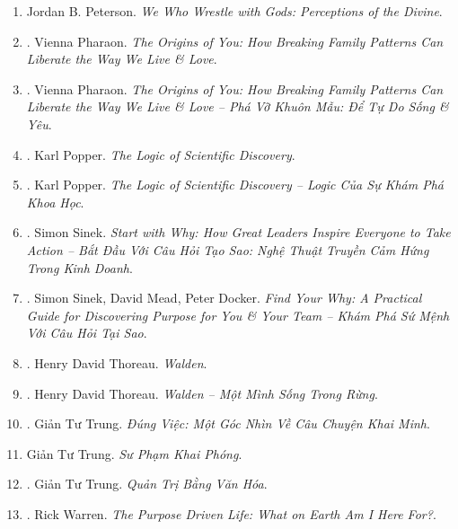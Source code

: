 \documentclass{article}
\begin{document}
\begin{enumerate}
	\item {\sc Jordan B. Peterson}. {\it We Who Wrestle with Gods: Perceptions of the Divine}.
	
	\item \cite{Pharaon_origins}. {\sc Vienna Pharaon}. {\it The Origins of You: How Breaking Family Patterns Can Liberate the Way We Live \& Love}.
	
	\item \cite{Pharaon_origins_VN}. {\sc Vienna Pharaon}. {\it The Origins of You: How Breaking Family Patterns Can Liberate the Way We Live \& Love -- Phá Vỡ Khuôn Mẫu: Để Tự Do Sống \& Yêu}.\hfill{\sf[done]}
	
	\item \cite{Popper_logic_science}. {\sc Karl Popper}. {\it The Logic of Scientific Discovery}.
	
	\item \cite{Popper_logic_khoa_hoc}. {\sc Karl Popper}. {\it The Logic of Scientific Discovery -- Logic Của Sự Khám Phá Khoa Học}.\hfill{\sf[done]}
	
	\item \cite{Sinek_start_why}. {\sc Simon Sinek}. {\it Start with Why: How Great Leaders Inspire Everyone to Take Action -- Bắt Đầu Với Câu Hỏi Tạo Sao: Nghệ Thuật Truyền Cảm Hứng Trong Kinh Doanh}.\hfill{\sf[done]}
	
	\item \cite{Sinek_Mead_Docker_why}. {\sc Simon Sinek, David Mead, Peter Docker}. {\it Find Your Why: A Practical Guide for Discovering Purpose for You \& Your Team -- Khám Phá Sứ Mệnh Với Câu Hỏi Tại Sao}.\hfill{\sf[done]}
	
	\item \cite{Thoreau_Walden}. {\sc Henry David Thoreau}. {\it Walden}.\hfill{\sf[reading]}
	
	\item \cite{Thoreau_Walden_VN}. {\sc Henry David Thoreau}. {\it Walden -- Một Mình Sống Trong Rừng}.\hfill{\sf[done]}
	
	\item \cite{Trung_dung_viec}. {\sc Giản Tư Trung}. {\it Đúng Việc: Một Góc Nhìn Về Câu Chuyện Khai Minh}.\hfill{\sf[done]}
	
	\item {\sc Giản Tư Trung}. {\it Sư Phạm Khai Phóng}.
	
	\item \cite{Trung_van_hoa}. {\sc Giản Tư Trung}. {\it Quản Trị Bằng Văn Hóa}.\hfill{\sf[done]}
	
	\item \cite{Warren_purpose_driven_life}. {\sc Rick Warren}. {\it The Purpose Driven Life: What on Earth Am I Here For?}. {}
	

\end{enumerate}
\end{document}
